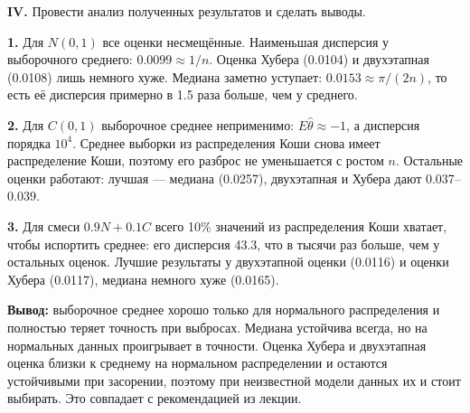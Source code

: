 \documentclass{article}
\begin{document}
\begin{framed}
    \textbf{IV.} Провести анализ полученных результатов и сделать выводы.
\end{framed}
    \textbf{1.} Для $N(0,1)$ все оценки несмещённые. Наименьшая дисперсия у выборочного среднего: $0.0099\approx1/n$. Оценка Хубера (0.0104) и двухэтапная (0.0108) лишь немного хуже. Медиана заметно уступает: $0.0153\approx\pi/(2n)$, то есть её дисперсия примерно в 1.5 раза больше, чем у среднего.

    \textbf{2.} Для $C(0,1)$ выборочное среднее неприменимо: $E\hat\theta\approx-1$, а дисперсия порядка $10^4$. Среднее выборки из распределения Коши снова имеет распределение Коши, поэтому его разброс не уменьшается с ростом $n$. Остальные оценки работают: лучшая --- медиана (0.0257), двухэтапная и Хубера дают 0.037--0.039.

    \textbf{3.} Для смеси $0.9N+0.1C$ всего 10\% значений из распределения Коши хватает, чтобы испортить среднее: его дисперсия 43.3, что в тысячи раз больше, чем у остальных оценок. Лучшие результаты у двухэтапной оценки (0.0116) и оценки Хубера (0.0117), медиана немного хуже (0.0165).

    \textbf{Вывод:} выборочное среднее хорошо только для нормального распределения и полностью теряет точность при выбросах. Медиана устойчива всегда, но на нормальных данных проигрывает в точности. Оценка Хубера и двухэтапная оценка близки к среднему на нормальном распределении и остаются устойчивыми при засорении, поэтому при неизвестной модели данных их и стоит выбирать. Это совпадает с рекомендацией из лекции.
\end{document}
